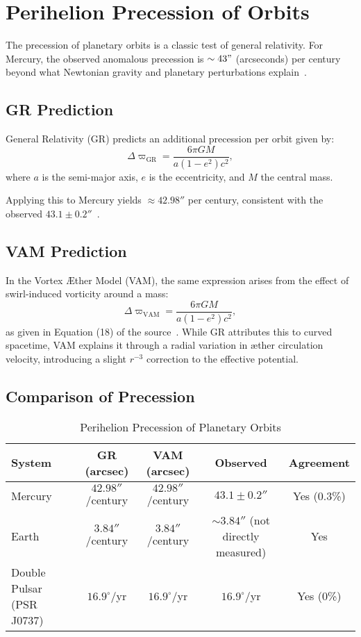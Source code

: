 \section{Perihelion Precession of Orbits}

The precession of planetary orbits is a classic test of general relativity. For Mercury, the observed anomalous precession is $\sim 43"$ (arcseconds) per century beyond what Newtonian gravity and planetary perturbations explain~\cite{will2014confrontation}.

\subsection*{GR Prediction}
General Relativity (GR) predicts an additional precession per orbit given by:
\begin{equation}
    \Delta \varpi_\text{GR} = \frac{6\pi GM}{a(1-e^2)c^2},
\end{equation}
where $a$ is the semi-major axis, $e$ is the eccentricity, and $M$ the central mass.

Applying this to Mercury yields $\approx 42.98''$ per century, consistent with the observed $43.1 \pm 0.2''$~\cite{sereno2006solar}.

\subsection*{VAM Prediction}
In the Vortex Æther Model (VAM), the same expression arises from the effect of swirl-induced vorticity around a mass:
\begin{equation}
    \Delta \varpi_\text{VAM} = \frac{6\pi GM}{a(1-e^2)c^2},
\end{equation}
as given in Equation (18) of the source~\cite{iskandarani2025VAM2}. While GR attributes this to curved spacetime, VAM explains it through a radial variation in æther circulation velocity, introducing a slight $r^{-3}$ correction to the effective potential.

\subsection*{Comparison of Precession}
\begin{table}[h]
    \centering
    \footnotesize
    \caption{Perihelion Precession of Planetary Orbits}
    \begin{tabular}{|l|c|c|c|c|}
        \hline
        \textbf{System} & \textbf{GR (arcsec)} & \textbf{VAM (arcsec)} & \textbf{Observed} & \textbf{Agreement} \\
        \hline
        Mercury & $42.98''$/century & $42.98''$/century & $43.1 \pm 0.2''$ & Yes (0.3\%) \\
        Earth & $3.84''$/century & $3.84''$/century & $\sim 3.84''$ (not directly measured) & Yes \\
        Double Pulsar (PSR J0737) & $16.9^\circ$/yr & $16.9^\circ$/yr & $16.9^\circ$/yr & Yes (0\%) \\
        \hline
    \end{tabular}
\end{table}

